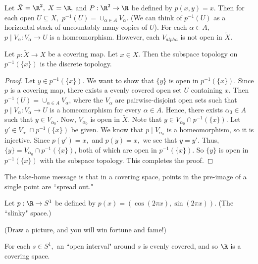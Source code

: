 \begin{example}
Let $\tilde{X}=\R^2,$ $X=\R,$ and $P:\R^2\rightarrow \R$ be defined by $p(x,y)=x$.  Then for each open $U \subseteq X,$ $p^{-1}(U)=\cup_{\alpha \in A}V_{\alpha}.$  (We can think of $p^{-1}(U)$ as a horizontal stack of uncountably many copies of $U$).  For each $\alpha \in A,$ $p \mid V_{\alpha}: V_{\alpha} \rightarrow U$ is a homeomorphism.  However, each $V_{alpha}$ is not open in $\tilde{X}$.  

\placeholder
\end{example}

\begin{lemma}
Let $p:\tilde{X} \rightarrow X$ be a covering map.  Let $x \in X$.  Then the subspace topology on $p^{-1}(\{x\})$ is the discrete topology.
\end{lemma}

\begin{proof}
Let $y \in p^{-1}(\{x\}).$  We want to show that $\{y\}$ is open in $p^{-1}(\{x\})$.  Since $p$ is a covering map, there exists a evenly covered open set $U$ containing $x$.  Then $p^{-1}(U)=\cup_{\alpha \in A}V_{\alpha}$, where the $V_{\alpha}$ are pairwise-disjoint open sets such that $p \mid V_{\alpha}:V_{\alpha}\rightarrow U$ is a homeomorphism for every $\alpha \in A$.  Hence, there exists $\alpha_0 \in A$ such that $y \in V_{\alpha_0}$.  Now, $V_{\alpha_0}$ is open in $\tilde{X}$.  Note that $y \in V_{\alpha_0}\cap p^{-1}(\{x\})$.  Let $y' \in V_{\alpha_0} \cap p^{-1}(\{x\})$ be given.  We know that $p \mid V_{\alpha_0}$ is a homeomorphism, so it is injective.  Since $p(y')=x,$ and $p(y)=x,$ we see that $y=y'$.  Thus, $\{y\}=V_{\alpha_0} \cap p^{-1}(\{x\})$, both of which are open in $p^{-1}(\{x\}).$ So $\{y\}$ is open in $p^{-1}(\{x\})$ with the subspace topology.  This completes the proof.
\end{proof}

The take-home message is that in a covering space, points in the pre-image of a single point are ``spread out."

\begin{example}[Important] Let $p:\R \rightarrow S^1$ be defined by $p(x)=(\cos(2 \pi x), \sin(2 \pi x))$.  (The ``slinky" space.)

(Draw a picture, and you will win fortune and fame!)
\placeholder

For each $s \in S^1,$ an ``open interval" around $s$ is evenly covered, and so $\R$ is a covering space.  
\end{example}

